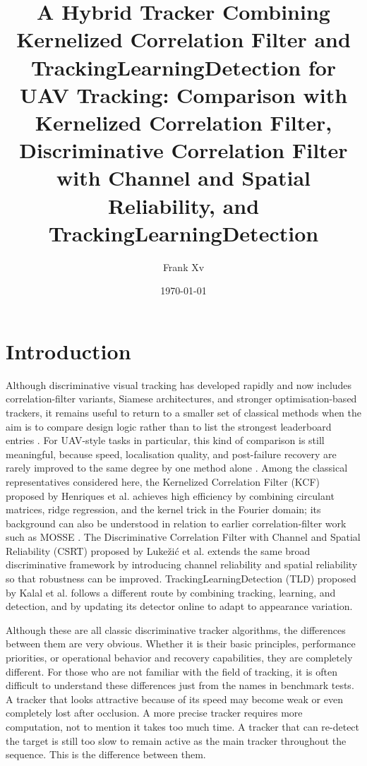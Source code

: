 \documentclass[12pt,a4paper]{article}
\title{A Hybrid Tracker Combining Kernelized Correlation Filter and Tracking\textendash Learning\textendash Detection for UAV Tracking: Comparison with Kernelized Correlation Filter, Discriminative Correlation Filter with Channel and Spatial Reliability, and Tracking\textendash Learning\textendash Detection}
\author{Frank Xv}
\date{\today}
\begin{document}
\maketitle
\tableofcontents


\section{Introduction}
Although discriminative visual tracking has developed rapidly and now includes correlation-filter variants, Siamese architectures, and stronger optimisation-based trackers, it remains useful to return to a smaller set of classical methods when the aim is to compare design logic rather than to list the strongest leaderboard entries \cite{smeulders2014survey,bertinetto2016siamfc,danelljan2017eco,danelljan2019atom}. For UAV-style tasks in particular, this kind of comparison is still meaningful, because speed, localisation quality, and post-failure recovery are rarely improved to the same degree by one method alone \cite{fan2022uav,gao2019deeprelative}. Among the classical representatives considered here, the Kernelized Correlation Filter (KCF) proposed by Henriques et al. \cite{henriques2015kcf} achieves high efficiency by combining circulant matrices, ridge regression, and the kernel trick in the Fourier domain; its background can also be understood in relation to earlier correlation-filter work such as MOSSE \cite{bolme2010mosse}. The Discriminative Correlation Filter with Channel and Spatial Reliability (CSRT) proposed by Luke\v{z}i\'c et al. \cite{lukezic2017csrt} extends the same broad discriminative framework by introducing channel reliability and spatial reliability so that robustness can be improved. Tracking\textendash Learning\textendash Detection (TLD) proposed by Kalal et al. \cite{kalal2012tld} follows a different route by combining tracking, learning, and detection, and by updating its detector online to adapt to appearance variation.

Although these are all classic discriminative tracker algorithms, the differences between them are very obvious. Whether it is their basic principles, performance priorities, or operational behavior and recovery capabilities, they are completely different. For those who are not familiar with the field of tracking, it is often difficult to understand these differences just from the names in benchmark tests. A tracker that looks attractive because of its speed may become weak or even completely lost after occlusion. A more precise tracker requires more computation, not to mention it takes too much time. A tracker that can re-detect the target is still too slow to remain active as the main tracker throughout the sequence. This is the difference between them.
\end{document}
